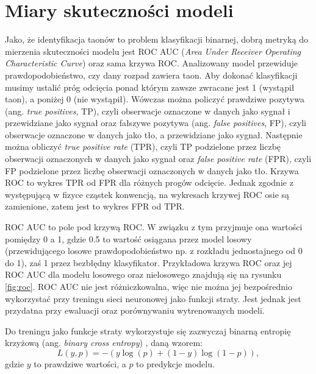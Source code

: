 \documentclass{pracalicmgr}
\begin{document}
	\section{Miary skuteczności modeli}
	Jako, że identyfikacja taonów to problem klasyfikacji binarnej, dobrą metryką do mierzenia skuteczności modelu jest ROC AUC (\textit{Area Under Receiver Operating Characteristic Curve}) oraz sama krzywa ROC. Analizowany model przewiduje prawdopodobieństwo, czy dany rozpad zawiera taon. Aby dokonać klasyfikacji musimy ustalić próg odcięcia ponad którym zawsze zwracane jest 1 (wystąpił taon), a poniżej 0 (nie wystąpił). Wówczas można policzyć prawdziwe pozytywa (ang. \textit{true positives}, TP), czyli obserwacje oznaczone w danych jako sygnał i przewidziane jako sygnał oraz fałszywe pozytywa (ang. \textit{false positives}, FP), czyli obserwacje oznaczone w danych jako tło, a przewidziane jako sygnał. Następnie można obliczyć \textit{true positive rate} (TPR), czyli TP podzielone przez liczbę obserwacji oznaczonych w danych jako sygnał oraz \textit{false positive rate} (FPR), czyli FP podzielone przez liczbę obserwacji oznaczonych w danych jako tło. Krzywa ROC to wykres TPR od FPR dla różnych progów odcięcie. Jednak zgodnie z występującą w fizyce cząstek konwencją, na wykresach krzywej ROC osie są zamienione, zatem jest to wykres FPR od TPR. 
	
	ROC AUC to pole pod krzywą ROC. W związku z tym przyjmuje ona wartości pomiędzy 0 a 1, gdzie 0.5 to wartość osiągana przez model losowy (przewidującego losowe prawdopodobieństwo np. z rozkładu jednostajnego od 0 do 1), zaś 1 przez bezbłędny klasyfikator. Przykładowa krzywa ROC oraz jej ROC AUC dla modelu losowego oraz nielosowego znajdują się na rysunku \ref{fig:roc}. ROC AUC nie jest różniczkowalna, więc nie można jej bezpośrednio wykorzystać przy treningu sieci neuronowej jako funkcji straty. Jest jednak jest przydatna przy ewaluacji oraz porównywaniu wytrenowanych modeli. 
	
	Do treningu jako funkcje straty wykorzystuje się zazwyczaj binarną entropię krzyżową (ang. \textit{binary cross entropy}) \cite{dl}, daną wzorem: $$ L(y, p) = -(y\log(p)+(1-y)\log(1-p)),$$ gdzie $y$ to prawdziwe wartości, a $p$ to predykcje modelu.
\end{document}
